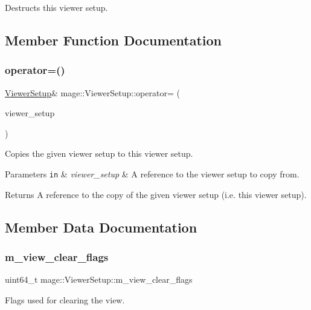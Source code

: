 Destructs this viewer setup. 

\subsection{Member Function Documentation}
\hypertarget{structmage_1_1_viewer_setup_a2828b504ea3b85a0f8421bac32fa37dd}{}\label{structmage_1_1_viewer_setup_a2828b504ea3b85a0f8421bac32fa37dd} 
\subsubsection{\texorpdfstring{operator=()}{operator=()}}
{\footnotesize\ttfamily \hyperlink{structmage_1_1_viewer_setup}{Viewer\+Setup}\& mage\+::\+Viewer\+Setup\+::operator= (\begin{DoxyParamCaption}\item[{const \hyperlink{structmage_1_1_viewer_setup}{Viewer\+Setup} \&}]{viewer\+\_\+setup }\end{DoxyParamCaption})}

Copies the given viewer setup to this viewer setup.


\begin{DoxyParams}[1]{Parameters}
\mbox{\tt in}  & {\em viewer\+\_\+setup} & A reference to the viewer setup to copy from. \\
\hline
\end{DoxyParams}
\begin{DoxyReturn}{Returns}
A reference to the copy of the given viewer setup (i.\+e. this viewer setup). 
\end{DoxyReturn}


\subsection{Member Data Documentation}
\hypertarget{structmage_1_1_viewer_setup_aed7b78b5437c46627949142f628c331d}{}\label{structmage_1_1_viewer_setup_aed7b78b5437c46627949142f628c331d} 
\subsubsection{\texorpdfstring{m\+\_\+view\+\_\+clear\+\_\+flags}{m\_view\_clear\_flags}}
{\footnotesize\ttfamily uint64\+\_\+t mage\+::\+Viewer\+Setup\+::m\+\_\+view\+\_\+clear\+\_\+flags}

Flags used for clearing the view. 